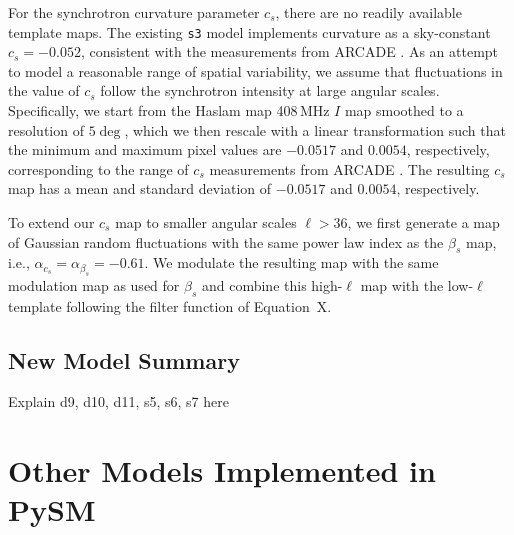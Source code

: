 \documentclass[twocolumn]{aastex631}
\begin{document}
For the synchrotron curvature parameter $c_s$, there are no readily available template maps. The existing \texttt{s3} model implements curvature as a sky-constant $c_s = -0.052$, consistent with the measurements from ARCADE \citep[$c_s=-0.052 \pm 0.005$][]{Kogut:2012}. As an attempt to model a reasonable range of spatial variability, we assume that fluctuations in the value of $c_s$ follow the synchrotron intensity at large angular scales. Specifically, we start from the Haslam map 408\,MHz $I$ map smoothed to a resolution of $5 \deg$, which we then rescale with a linear transformation such that the minimum and maximum pixel values are  $-0.0517$ and $0.0054$, respectively, corresponding to the range of $c_s$ measurements from ARCADE \citep{Kogut:2012}. The resulting $c_s$ map has a mean and standard deviation of $-0.0517$ and $0.0054$, respectively. 


To extend our $c_s$ map to smaller angular scales $\ell > 36$, we first generate a map of Gaussian random fluctuations with the same power law index as the $\beta_s$ map, i.e., $\alpha _{c_s}=\alpha _{\beta_s} = -0.61$. We modulate the resulting map with the same modulation map as used for $\beta_s$ and combine this high-$\ell$ map with the low-$\ell$ template following the filter function of Equation~X.

\subsection{New Model Summary}
Explain d9, d10, d11, s5, s6, s7 here

\section{Other Models Implemented in PySM} \label{sec:other_models}
\end{document}
